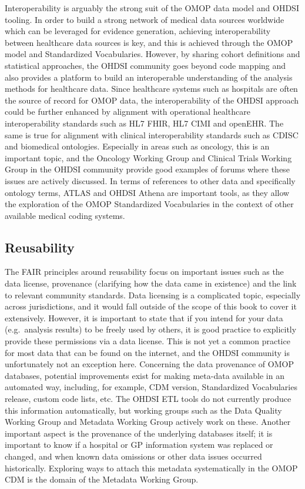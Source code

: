 \documentclass[11pt]{book}
\theoremstyle{definition}
\theoremstyle{definition}
\theoremstyle{definition}
\theoremstyle{remark}
\begin{document}
Interoperability is arguably the strong suit of the OMOP data model and
OHDSI tooling. In order to build a strong network of medical data
sources worldwide which can be leveraged for evidence generation,
achieving interoperability between healthcare data sources is key, and
this is achieved through the OMOP model and Standardized Vocabularies.
However, by sharing cohort definitions and statistical approaches, the
OHDSI community goes beyond code mapping and also provides a platform to
build an interoperable understanding of the analysis methods for
healthcare data. Since healthcare systems such as hospitals are often
the source of record for OMOP data, the interoperability of the OHDSI
approach could be further enhanced by alignment with operational
healthcare interoperability standards such as HL7 FHIR, HL7 CIMI and
openEHR. The same is true for alignment with clinical interoperability
standards such as CDISC and biomedical ontologies. Especially in areas
such as oncology, this is an important topic, and the Oncology Working
Group and Clinical Trials Working Group in the OHDSI community provide
good examples of forums where these issues are actively discussed. In
terms of references to other data and specifically ontology terms, ATLAS
and OHDSI Athena are important tools, as they allow the exploration of
the OMOP Standardized Vocabularies in the context of other available
medical coding systems.

\subsection{Reusability}\label{reusability}

The FAIR principles around reusability focus on important issues such as
the data license, provenance (clarifying how the data came in existence)
and the link to relevant community standards. Data licensing is a
complicated topic, especially across jurisdictions, and it would fall
outside of the scope of this book to cover it extensively. However, it
is important to state that if you intend for your data (e.g.~analysis
results) to be freely used by others, it is good practice to explicitly
provide these permissions via a data license. This is not yet a common
practice for most data that can be found on the internet, and the OHDSI
community is unfortunately not an exception here. Concerning the data
provenance of OMOP databases, potential improvements exist for making
meta-data available in an automated way, including, for example, CDM
version, Standardized Vocabularies release, custom code lists, etc. The
OHDSI ETL tools do not currently produce this information automatically,
but working groups such as the Data Quality Working Group and Metadata
Working Group actively work on these. Another important aspect is the
provenance of the underlying databases itself; it is important to know
if a hospital or GP information system was replaced or changed, and when
known data omissions or other data issues occurred historically.
Exploring ways to attach this metadata systematically in the OMOP CDM is
the domain of the Metadata Working Group.
\end{document}
